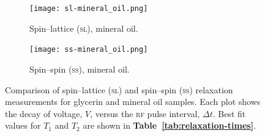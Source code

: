 \documentclass[12pt]{report}
\begin{document}
{\begin{figure}[tbh]
        \vspace{\baselineskip} %
        
        \begin{subfigure}{0.45\textwidth}
            \centering
            \texttt{[image: sl-mineral\_oil.png]}
            \caption{Spin–lattice (\textsc{sl}), mineral oil.}
            \label{fig:sl-mineral-oil}
        \end{subfigure}
        \hspace{0.02\textwidth} %
        \begin{subfigure}{0.45\textwidth}
            \centering
            \texttt{[image: ss-mineral\_oil.png]}
            \caption{Spin–spin (\textsc{ss}), mineral oil.}
            \label{fig:ss-mineral-oil}
        \end{subfigure}
        
        \caption{Comparison of spin–lattice (\textsc{sl}) and spin–spin (\textsc{ss}) relaxation measurements for glycerin and mineral oil samples. Each plot shows the decay of voltage, $V$, versus the \textsc{rf} pulse interval, $\Delta t$. Best fit values for $T_1$ and $T_2$ are shown in \textbf{Table~\ref{tab:relaxation-times}}.}
        \label{fig:fit-plots}
    \end{figure}
    
}
\end{document}
